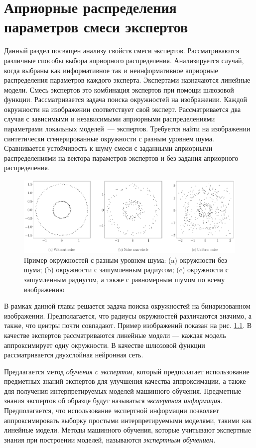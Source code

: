 \chapter{Априорные распределения параметров смеси экспертов}

Данный раздел посвящен анализу свойств смеси экспертов. Рассматриваются различные способы выбора априорного распределения. Анализируется случай, когда выбраны как информативное так и неинформативное априорные распределения параметров каждого эксперта. Экспертами назначаются линейные модели. Смесь экспертов это комбинация экспертов при помощи шлюзовой функции. Рассматривается задача поиска окружностей на изображении. Каждой окружности на изображении соответствует свой эксперт. Рассматривается два случая с зависимыми и независимыми априорными распределениями параметрами локальных моделей~--- экспертов. Требуется найти на изображении синтетически сгенерированные окружности с разным уровнем шума. Сравнивается устойчивость к шуму смеси с заданными априорными распределениями на вектора параметров экспертов и без задания априорного распределения.

\begin{figure}[h!t]\center
\includegraphics[width=1\textwidth]{results/priorexpert/statment}
\caption{Пример окружностей с разным уровнем шума: (a) окружности без шума; (b) окружности с зашумленным радиусом; (c) окружности с зашумленным радиусом, а также с равномерным шумом по всему изображению}
\label{example-exp:1}
\end{figure}

В рамках данной главы решается задача поиска окружностей на бинаризованном изображении. Предполагается, что радиусы окружностей различаются значимо, а также, что центры почти совпадают. Пример изображений показан на рис. \ref{example-exp:1}. В качестве экспертов рассматриваются линейные модели --- каждая модель аппроксимирует одну окружности. В качестве шлюзовой функции рассматривается двухслойная нейронная сеть.

Предлагается метод \textit{обучения с экспертом}, который предполагает использование предметных знаний экспертов для улучшения качества аппроксимации, а также для получения интерпретируемых моделей машинного обучения.
Предметные знания экспертов об образце будут называться \textit{экспертная информация}.
Предполагается, что использование экспертной информации позволяет аппроксимировать выборку простыми интерпретируемыми моделями, такими как линейные модели. Методы машинного обучения, которые учитывают экспертные знания при построении моделей, называются \textit{экспертным обучением}.

